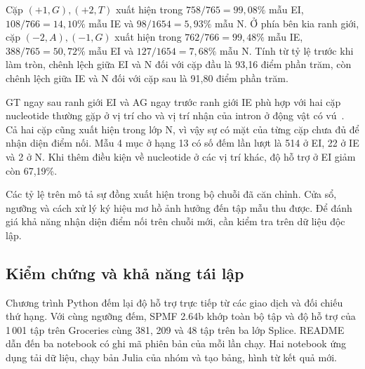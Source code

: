 Cặp $(+1,G),(+2,T)$ xuất hiện trong $758/765=99{,}08\%$ mẫu
EI, $108/766=14{,}10\%$ mẫu IE và $98/1654=5{,}93\%$ mẫu N.
Ở phía bên kia ranh giới, cặp $(-2,A),(-1,G)$ xuất hiện trong
$762/766=99{,}48\%$ mẫu IE, $388/765=50{,}72\%$ mẫu EI và
$127/1654=7{,}68\%$ mẫu N. Tính từ tỷ lệ trước khi làm tròn,
chênh lệch giữa EI và N đối với cặp đầu là 93,16 điểm phần
trăm, còn chênh lệch giữa IE và N đối với cặp sau là 91,80
điểm phần trăm.

GT ngay sau ranh giới EI và AG ngay trước ranh giới IE phù
hợp với hai cặp nucleotide thường gặp ở vị trí cho và vị trí
nhận của intron ở động vật có vú~\cite{burset2000}. Cả hai cặp
cũng xuất hiện trong lớp N, vì vậy sự có mặt của từng cặp
chưa đủ để nhận diện điểm nối. Mẫu 4 mục ở hạng 13 có số đếm
lần lượt là 514 ở EI, 22 ở IE và 2 ở N. Khi thêm điều kiện
về nucleotide ở các vị trí khác, độ hỗ trợ ở EI giảm còn
67,19\%.

Các tỷ lệ trên mô tả sự đồng xuất hiện trong bộ chuỗi đã căn
chỉnh. Cửa sổ, ngưỡng và cách xử lý ký hiệu mơ hồ ảnh hưởng
đến tập mẫu thu được. Để đánh giá khả năng nhận diện điểm nối
trên chuỗi mới, cần kiểm tra trên dữ liệu độc lập.

\subsection{Kiểm chứng và khả năng tái lập}
Chương trình Python đếm lại độ hỗ trợ trực tiếp từ các giao
dịch và đối chiếu thứ hạng. Với cùng ngưỡng đếm, SPMF 2.64b
khớp toàn bộ tập và độ hỗ trợ của 1\,001 tập trên Groceries
cùng 381, 209 và 48 tập trên ba lớp Splice. README dẫn đến
ba notebook có ghi mã phiên bản của mỗi lần chạy. Hai notebook
ứng dụng tải dữ liệu, chạy bản Julia của nhóm và tạo bảng, hình
từ kết quả mới.
